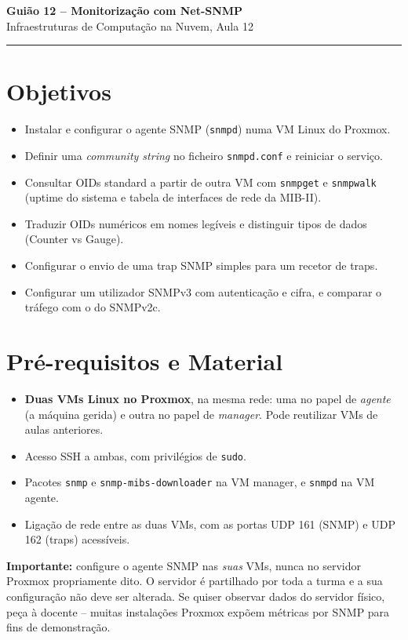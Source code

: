 \documentclass[11pt,a4paper]{article}
\newcommand{\guiaotitle}[2]{%
  \begin{center}
  {\Large\bfseries\color{TextEspresso} #1}\\[0.3cm]
  {\normalsize\color{NudeTaupe} #2}\\[0.2cm]
  {\color{NudeTaupe}\rule{4cm}{0.5pt}}
  \end{center}
  \vspace{0.5cm}
}
\begin{document}
\guiaotitle{Guião 12 -- Monitorização com Net-SNMP}{Infraestruturas de Computação na Nuvem, Aula 12}

\section{Objetivos}
\begin{itemize}[itemsep=0.2cm]
  \item Instalar e configurar o agente SNMP (\texttt{snmpd}) numa VM Linux do Proxmox.
  \item Definir uma \textit{community string} no ficheiro \texttt{snmpd.conf} e reiniciar o serviço.
  \item Consultar OIDs standard a partir de outra VM com \texttt{snmpget} e \texttt{snmpwalk} (uptime do sistema e tabela de interfaces de rede da MIB-II).
  \item Traduzir OIDs numéricos em nomes legíveis e distinguir tipos de dados (Counter vs Gauge).
  \item Configurar o envio de uma trap SNMP simples para um recetor de traps.
  \item Configurar um utilizador SNMPv3 com autenticação e cifra, e comparar o tráfego com o do SNMPv2c.
\end{itemize}

\section{Pré-requisitos e Material}
\begin{itemize}[itemsep=0.2cm]
  \item \textbf{Duas VMs Linux no Proxmox}, na mesma rede: uma no papel de \emph{agente} (a máquina gerida) e outra no papel de \emph{manager}. Pode reutilizar VMs de aulas anteriores.
  \item Acesso SSH a ambas, com privilégios de \texttt{sudo}.
  \item Pacotes \texttt{snmp} e \texttt{snmp-mibs-downloader} na VM manager, e \texttt{snmpd} na VM agente.
  \item Ligação de rede entre as duas VMs, com as portas UDP 161 (SNMP) e UDP 162 (traps) acessíveis.
\end{itemize}

\textbf{Importante:} configure o agente SNMP nas \emph{suas} VMs, nunca no servidor Proxmox propriamente dito. O servidor é partilhado por toda a turma e a sua configuração não deve ser alterada. Se quiser observar dados do servidor físico, peça à docente -- muitas instalações Proxmox expõem métricas por SNMP para fins de demonstração.
\end{document}
